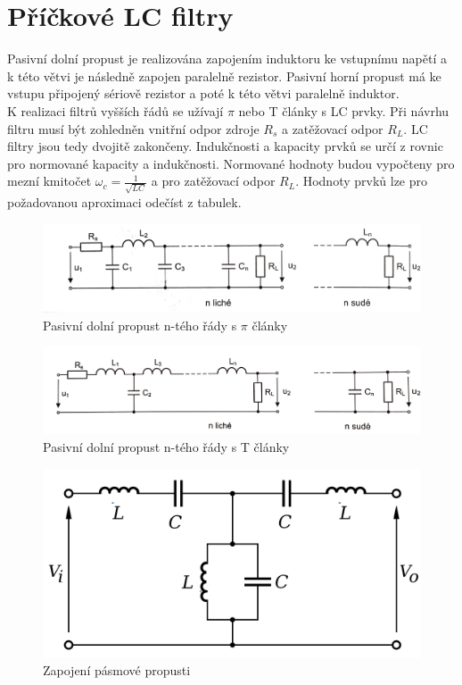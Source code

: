 \documentclass[twoside]{article}
\begin{document}
\section{Příčkové LC filtry}
Pasivní dolní propust je realizována zapojením induktoru ke vstupnímu napětí a k této větvi je následně zapojen paralelně rezistor. Pasivní horní propust má ke vstupu připojený sériově rezistor a poté k této větvi paralelně induktor. \\
K realizaci filtrů vyšších řádů se užívají $\pi$ nebo T články s LC prvky. Při návrhu filtru musí být zohledněn vnitřní odpor zdroje $R_s$ a zatěžovací odpor $R_L$. LC filtry jsou tedy dvojitě zakončeny. Indukčnosti a kapacity prvků se určí z rovnic pro normované kapacity a indukčnosti. Normované hodnoty budou vypočteny pro mezní kmitočet $\omega _c = \frac{1}{\sqrt{LC}}$ a pro zatěžovací odpor $R_L$. Hodnoty prvků lze pro požadovanou aproximaci odečíst z tabulek. \\
\begin{figure}[H]
\centering
\includegraphics[scale=0.1]{piclanky.png}
\caption{Pasivní dolní propust n-tého řády s $\pi$ články \cite{10}}
\end{figure}
\begin{figure}[H]
\centering
\includegraphics[scale=0.08]{tclanky.png}
\caption{Pasivní dolní propust n-tého řády s T články \cite{10}}
\end{figure}
\begin{figure}[H]
\centering
\includegraphics[scale=0.1]{Bandpass_Filter.png}
\caption{Zapojení pásmové propusti \cite{11}}
\end{figure}
\end{document}
